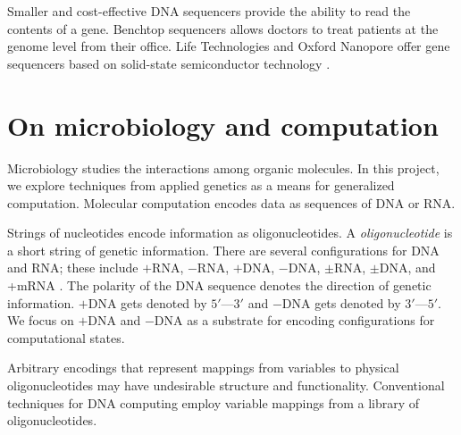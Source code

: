 Smaller and cost-effective DNA sequencers provide the ability to read the contents of a gene.  Benchtop sequencers \cite{ionTorrent, oxfordNanopore} allows doctors to treat patients at the genome level from their office.  Life Technologies and Oxford Nanopore offer gene sequencers based on solid-state semiconductor technology \cite{ionTorrent, oxfordNanopore}.	

\section{On microbiology and computation}

	
	Microbiology studies the interactions among organic molecules.  In this project, we explore techniques from applied genetics as a means for generalized computation.  Molecular computation encodes data as sequences of DNA or RNA.  
	
		

	
	Strings of nucleotides encode information as oligonucleotides.  A \textit{oligonucleotide} is a short string of genetic information.  There are several configurations for DNA and RNA; these include $+$RNA, $-$RNA, $+$DNA, $-$DNA, $\pm$RNA, $\pm$DNA, and +mRNA \cite{baltimore1971exp}.  The polarity of the DNA sequence denotes the direction of genetic information.  $+$DNA gets denoted by $5'$---$3'$ and $-$DNA gets denoted by $3'$---$5'$.  We focus on $+$DNA and $-$DNA as a substrate for encoding configurations for computational states.
	
	Arbitrary encodings that represent mappings from variables to physical oligonucleotides may have undesirable structure and functionality.  Conventional techniques for DNA computing employ variable mappings from a library of oligonucleotides.
	
